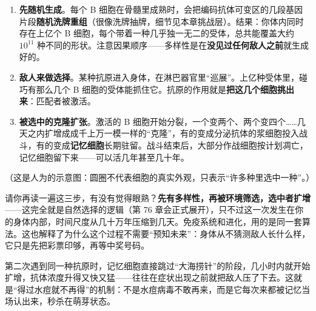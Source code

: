 \begin{enumerate}[itemsep=2pt]
\item \textbf{先随机生成}。每个 B 细胞在骨髓里成熟时，会把编码抗体可变区的几段基因片段\textbf{随机洗牌重组}（很像洗牌抽牌，细节见本章挑战层）。结果：你体内同时存在上亿个 B 细胞，每个带着一种几乎独一无二的受体，总共能覆盖大约 $10^{11}$ 种不同的形状。注意因果顺序——多样性是在\textbf{没见过任何敌人之前}就生成好的。
\item \textbf{敌人来做选择}。某种抗原进入身体，在淋巴器官里“巡展”。上亿种受体里，碰巧有那么几个 B 细胞的受体能抓住它。抗原的作用就是\textbf{把这几个细胞挑出来}：匹配者被激活。
\item \textbf{被选中的克隆扩张}。激活的 B 细胞开始分裂，一个变两个、两个变四个……几天之内扩增成成千上万一模一样的“克隆”，有的变成分泌抗体的浆细胞投入战斗，有的变成\textbf{记忆细胞}长期驻留。战斗结束后，大部分作战细胞按计划凋亡，记忆细胞留下来——可以活几年甚至几十年。
\end{enumerate}

\begin{center}
\end{center}
\vspace{-1em}
（这是人为的示意图：圆圈不代表细胞的真实外观，只表示“许多种里选中一种”。）

请你再读一遍这三步，有没有觉得眼熟？\textbf{先有多样性，再被环境筛选，选中者扩增}——这完全就是自然选择的逻辑（第 76 章会正式展开），只不过这一次发生在你的身体内部，时间尺度从几十万年压缩到几天。免疫系统和进化，用的是同一套算法。这也解释了为什么这个过程不需要“预知未来”：身体从不猜测敌人长什么样，它只是先把彩票印够，再等中奖号码。

第二次遇到同一种抗原时，记忆细胞直接跳过“大海捞针”的阶段，几小时内就开始扩增，抗体浓度升得又快又猛——往往在症状出现之前就把敌人压了下去。这就是“得过水痘就不再得”的机制：不是水痘病毒不敢再来，而是它每次来都被记忆当场认出来，秒杀在萌芽状态。

